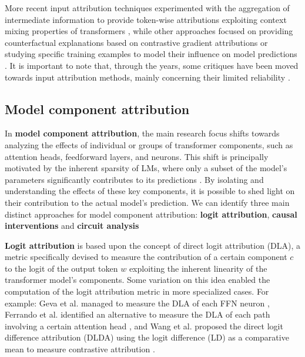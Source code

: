 More recent input attribution techniques experimented with the aggregation of intermediate information to provide token-wise attributions exploiting context mixing properties of transformers \cite{ferrando2022, modarressi2022, mohebbi2023}, while other approaches focused on providing counterfactual explanations based on contrastive gradient attributions \cite{yin2022} or studying specific training examples to model their influence on model predictions \cite{kwon2024, grosse2023}.
It is important to note that, through the years, some critiques have been moved towards input attribution methods, mainly concerning their limited reliability \cite{sixt2019, adebayo2018, atanasova2020}.

\subsection{Model component attribution}

In \textbf{model component attribution}, the main research focus shifts towards analyzing the effects of individual or groups of transformer components, such as attention heads, feedforward layers, and neurons.
This shift is principally motivated by the inherent sparsity of LMs, where only a subset of the model's parameters significantly contributes to its predictions .
By isolating and understanding the effects of these key components, it is possible to shed light on their contribution to the actual model's prediction.
We can identify three main distinct approaches for model component attribution: \textbf{logit attribution}, \textbf{causal interventions} and \textbf{circuit analysis}

\textbf{Logit attribution} is based upon the concept of direct logit attribution (DLA), a metric specifically devised to measure the contribution of a certain component $c$ to the logit of the output token $w$ exploiting the inherent linearity of the transformer model's components.
Some variation on this idea enabled the computation of the logit attribution metric in more specialized cases.
For example: Geva et al. managed to measure the DLA of each FFN neuron \cite{geva2022}, Ferrando et al. identified an alternative to measure the DLA of each path involving a certain attention head \cite{ferrando2023}, and Wang et al. proposed the direct logit difference attribution (DLDA) using the logit difference (LD) as a comparative mean to measure contrastive attribution \cite{wang2022}.

